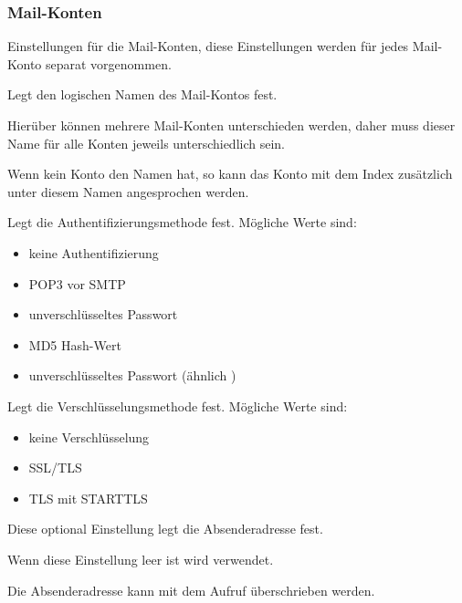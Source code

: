 \subsubsection {Mail-Konten}
    Einstellungen für die Mail-Konten, diese Einstellungen werden für 
    jedes Mail-Konto separat vorgenommen.
     
\begin {description}

    
    Legt den logischen Namen des Mail-Kontos fest.
    
    Hierüber können mehrere Mail-Konten unterschieden werden, 
    daher muss dieser Name für alle Konten jeweils unterschiedlich sein.
    
    Wenn kein Konto den Namen  hat, so kann das Konto mit 
    dem Index  zusätzlich unter diesem Namen angesprochen werden.
    
    
    Legt die Authentifizierungsmethode fest. Mögliche Werte sind:
    
    \begin {itemize}
      \item [\var{'none'}] keine Authentifizierung
      \item [\var{'pop'}] POP3 vor SMTP
      \item [\var{'plain'}] unverschlüsseltes Passwort
      \item [\var{'cram-md5'}] MD5 Hash-Wert
      \item [\var{'login'}] unverschlüsseltes Passwort (ähnlich )
    \end {itemize}
    

    Legt die Verschlüsselungsmethode fest. Mögliche Werte sind:
    
    \begin {itemize}
      \item [\var{'none'}] keine Verschlüsselung
      \item [\var{'TLS'}] SSL/TLS
      \item [\var{'STARTTLS'}] TLS mit STARTTLS
    \end {itemize}


    Diese optional Einstellung legt die Absenderadresse fest.
    
    Wenn diese Einstellung leer ist wird 
     verwendet.
    
    Die Absenderadresse kann mit dem  Aufruf 
    überschrieben werden.
 
\end{description}

